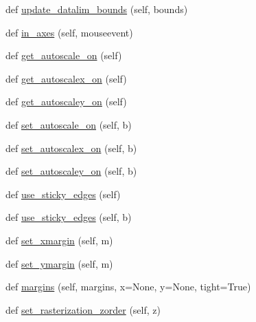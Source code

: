 \begin{DoxyCompactItemize}
\item 
def \hyperlink{classmatplotlib_1_1axes_1_1__base_1_1__AxesBase_a0832c48eed25452df95baae0fef9e208}{update\+\_\+datalim\+\_\+bounds} (self, bounds)
\item 
def \hyperlink{classmatplotlib_1_1axes_1_1__base_1_1__AxesBase_aa956af6247b6e33d02b5e2e20aa290ff}{in\+\_\+axes} (self, mouseevent)
\item 
def \hyperlink{classmatplotlib_1_1axes_1_1__base_1_1__AxesBase_a526c80806898608f6223121af797ea97}{get\+\_\+autoscale\+\_\+on} (self)
\item 
def \hyperlink{classmatplotlib_1_1axes_1_1__base_1_1__AxesBase_ac7a3032ab26ab599c61cd70188f39428}{get\+\_\+autoscalex\+\_\+on} (self)
\item 
def \hyperlink{classmatplotlib_1_1axes_1_1__base_1_1__AxesBase_af0104944bae1ba688f1fef622ce26aaa}{get\+\_\+autoscaley\+\_\+on} (self)
\item 
def \hyperlink{classmatplotlib_1_1axes_1_1__base_1_1__AxesBase_a53c98fcca20db3bac0310f1f0a3ca6e8}{set\+\_\+autoscale\+\_\+on} (self, b)
\item 
def \hyperlink{classmatplotlib_1_1axes_1_1__base_1_1__AxesBase_a9f0e955a7997aeb9a412f300e81f8cd8}{set\+\_\+autoscalex\+\_\+on} (self, b)
\item 
def \hyperlink{classmatplotlib_1_1axes_1_1__base_1_1__AxesBase_af7af12ff30af3b4a29ed35fd5308f032}{set\+\_\+autoscaley\+\_\+on} (self, b)
\item 
def \hyperlink{classmatplotlib_1_1axes_1_1__base_1_1__AxesBase_a6ad895824dbe2df1e84ed59622c729d7}{use\+\_\+sticky\+\_\+edges} (self)
\item 
def \hyperlink{classmatplotlib_1_1axes_1_1__base_1_1__AxesBase_abbaae57f9b1937f0a7aa073064ce82df}{use\+\_\+sticky\+\_\+edges} (self, b)
\item 
def \hyperlink{classmatplotlib_1_1axes_1_1__base_1_1__AxesBase_a1abfc0d9808356a70790db1782e590ca}{set\+\_\+xmargin} (self, m)
\item 
def \hyperlink{classmatplotlib_1_1axes_1_1__base_1_1__AxesBase_a8a74d543c4b549205cea2b8c94664f98}{set\+\_\+ymargin} (self, m)
\item 
def \hyperlink{classmatplotlib_1_1axes_1_1__base_1_1__AxesBase_a3c3e39d0eedc849927aa9ac859e903ec}{margins} (self, margins, x=None, y=None, tight=True)
\item 
def \hyperlink{classmatplotlib_1_1axes_1_1__base_1_1__AxesBase_a1a0ceec4b53b6125740dfb076ec7f5af}{set\+\_\+rasterization\+\_\+zorder} (self, z)
\item 

\end{DoxyCompactItemize}
